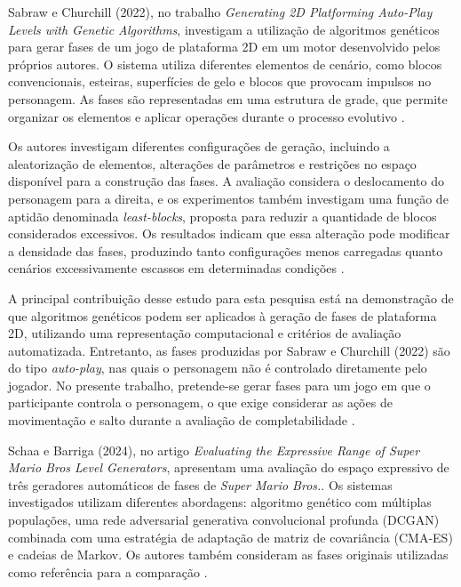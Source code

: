 Sabraw e Churchill (2022), no trabalho \textit{Generating
2D Platforming Auto-Play Levels with Genetic Algorithms},
investigam a utilização de algoritmos genéticos para gerar 
fases de um jogo de plataforma 2D em um motor desenvolvido 
pelos próprios autores. O sistema utiliza diferentes elementos 
de cenário, como blocos convencionais, esteiras, superfícies 
de gelo e blocos que provocam impulsos no personagem. 
As fases são representadas em uma estrutura de grade, que 
permite organizar os elementos e aplicar operações durante 
o processo evolutivo \cite{SabrawChurchill2022}.

Os autores investigam diferentes configurações de
geração, incluindo a aleatorização de elementos,
alterações de parâmetros e restrições no espaço
disponível para a construção das fases. A avaliação
considera o deslocamento do personagem para a direita,
e os experimentos também investigam uma função de
aptidão denominada \textit{least-blocks}, proposta
para reduzir a quantidade de blocos considerados excessivos.
Os resultados indicam que essa alteração
pode modificar a densidade das fases, produzindo tanto
configurações menos carregadas quanto cenários
excessivamente escassos em determinadas condições
\cite{SabrawChurchill2022}.

A principal contribuição desse estudo para esta
pesquisa está na demonstração de que algoritmos
genéticos podem ser aplicados à geração de fases
de plataforma 2D, utilizando uma representação
computacional e critérios de avaliação automatizada.
Entretanto, as fases produzidas por Sabraw
e Churchill (2022) são do tipo \textit{auto-play},
nas quais o personagem não é controlado diretamente
pelo jogador. No presente trabalho, pretende-se gerar
fases para um jogo em que o participante controla
o personagem, o que exige considerar as ações
de movimentação e salto durante a avaliação de
completabilidade \cite{SabrawChurchill2022}.

Schaa e Barriga (2024), no artigo \textit{Evaluating the
Expressive Range of Super Mario Bros Level Generators}, 
apresentam uma avaliação do espaço expressivo de três 
geradores automáticos de fases de \textit{Super Mario Bros.}. 
Os sistemas investigados utilizam diferentes abordagens:
algoritmo genético com múltiplas populações, uma
rede adversarial generativa convolucional profunda
(DCGAN) combinada com uma estratégia de adaptação
de matriz de covariância (CMA-ES) e cadeias de
Markov. Os autores também consideram as fases
originais utilizadas como referência para a
comparação \cite{SchaaBarriga2024}.

